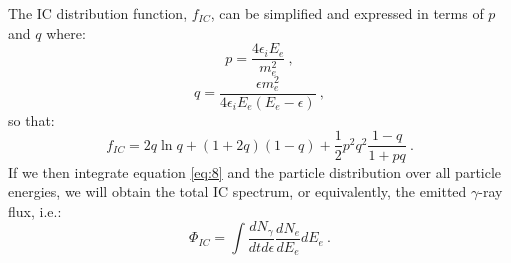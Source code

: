 \documentclass[12pt,a4paper]{article}
\begin{document}
The IC distribution function, $f_{IC}$, can be simplified and expressed in terms of $p$ and $q$ where:
\begin{equation} \label{eq:10}
p = \dfrac{4\epsilon_i E_e}{m_e^2} \ ,
\end{equation}
\begin{equation} \label{eq:11}
q = \dfrac{\epsilon m_e^2}{4\epsilon_i E_e (E_e - \epsilon)}\ ,
\end{equation}
so that:
\begin{equation} \label{eq:12}
f_{IC} = 2q\ln{q} + (1+2q)(1-q) + \dfrac{{1}}{2} p^2 q^2 \dfrac{1-q}{1+pq} \ .
\end{equation}
If we then integrate equation \ref{eq:8} and the particle distribution over all particle energies, we will obtain the total IC spectrum, or equivalently, the emitted $\gamma$-ray flux, i.e.:
\begin{equation} \label{eq:13}
\Phi_{IC} = \int \dfrac{dN_{\gamma}}{dtd\epsilon} \dfrac{dN_e}{dE_e} dE_e \ .
\end{equation}\\
\end{document}
